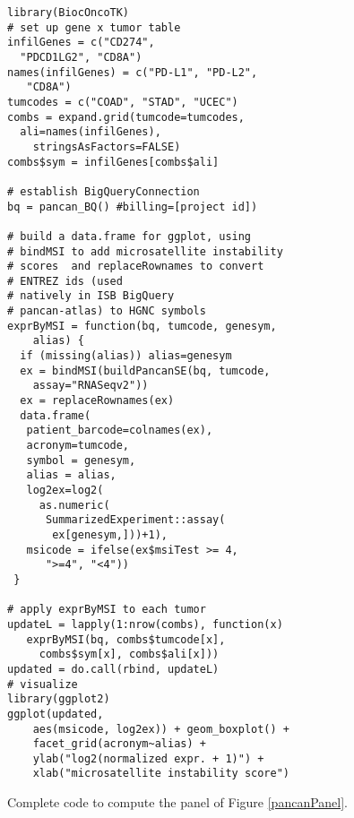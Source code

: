 
\begin{figure}
{\small
\begin{verbatim}
library(BiocOncoTK)
# set up gene x tumor table
infilGenes = c("CD274", 
  "PDCD1LG2", "CD8A")
names(infilGenes) = c("PD-L1", "PD-L2", 
   "CD8A")
tumcodes = c("COAD", "STAD", "UCEC")
combs = expand.grid(tumcode=tumcodes, 
  ali=names(infilGenes),
    stringsAsFactors=FALSE)
combs$sym = infilGenes[combs$ali]

# establish BigQueryConnection
bq = pancan_BQ() #billing=[project id])

# build a data.frame for ggplot, using
# bindMSI to add microsatellite instability 
# scores  and replaceRownames to convert 
# ENTREZ ids (used
# natively in ISB BigQuery 
# pancan-atlas) to HGNC symbols
exprByMSI = function(bq, tumcode, genesym, 
    alias) {
  if (missing(alias)) alias=genesym
  ex = bindMSI(buildPancanSE(bq, tumcode, 
    assay="RNASeqv2"))
  ex = replaceRownames(ex)
  data.frame(
   patient_barcode=colnames(ex),
   acronym=tumcode,
   symbol = genesym,
   alias = alias,
   log2ex=log2(
     as.numeric(
      SummarizedExperiment::assay(
       ex[genesym,]))+1),
   msicode = ifelse(ex$msiTest >= 4, 
      ">=4", "<4"))
 }

# apply exprByMSI to each tumor
updateL = lapply(1:nrow(combs), function(x) 
   exprByMSI(bq, combs$tumcode[x], 
     combs$sym[x], combs$ali[x]))
updated = do.call(rbind, updateL)
# visualize
library(ggplot2)
ggplot(updated,
    aes(msicode, log2ex)) + geom_boxplot() +
    facet_grid(acronym~alias) +
    ylab("log2(normalized expr. + 1)") +
    xlab("microsatellite instability score")
\end{verbatim}
}
\label{compl}
\caption{Complete code to compute the panel of Figure \ref{pancanPanel}.}
\end{figure}
